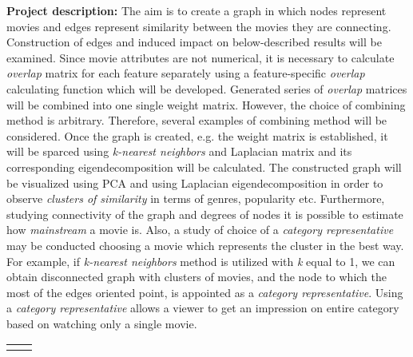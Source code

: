 \documentclass[12pt,a4paper]{report}
\let\openright=\clearpage
\begin{document}
\vspace{5mm}
\noindent \textbf{Project description:}
The aim is to create a graph in which nodes represent movies and edges represent similarity between the movies they are connecting. Construction of edges and induced impact on below-described results will be examined. Since movie attributes are not numerical, it is necessary to calculate \textit{overlap} matrix for each feature separately using a feature-specific \textit{overlap} calculating function which will be developed. Generated series of \textit{overlap} matrices will be combined into one single weight matrix. However, the choice of combining method is arbitrary. Therefore, several examples of combining method will be considered. Once the graph is created, e.g. the weight matrix is established, it will be sparced using \textit{k-nearest neighbors} and Laplacian matrix and its corresponding eigendecomposition will be calculated. The constructed graph will be visualized using PCA and using Laplacian eigendecomposition in order to observe \textit{clusters of similarity} in terms of genres, popularity etc. Furthermore, studying connectivity of the graph and degrees of nodes it is possible to estimate how \textit{mainstream} a movie is. Also, a study of choice of a \textit{category representative} may be conducted choosing a movie which represents the cluster in the best way. For example, if \textit{k-nearest neighbors} method is utilized with \textit{k} equal to 1, we can obtain disconnected graph with clusters of movies, and the node to which the most of the edges oriented point, is appointed as a \textit{category representative}. Using a \textit{category representative} allows a viewer to get an impression on entire category based on watching only a single movie. 




\begin{tabular}{rl}

\noalign{\vspace{2mm}}
\noalign{\vspace{2mm}}

\end{tabular}







\newpage


\newpage

\openright

\pagestyle{fancy}
\fancyhead{}
\fancyfoot{}

\fancyhead[LE,RO]{ \rightmark}

\fancyfoot[C]{\thepage}

\setcounter{page}{1}



\newpage

\newpage

\openright
\end{document}
